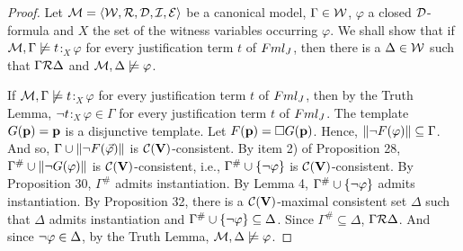 \begin{proof}
	Let $\mathcal{M} = \langle\mathcal{W},\mathcal{R},\mathcal{D},\mathcal{I},\mathcal{E} \rangle$ be a canonical model, $\Gamma \in \mathcal{W}$, $\varphi$ a closed $\mathcal{D}$-formula and $X$ the set of the witness variables occurring $\varphi$. We shall show that if $\mathcal{M}, \Gamma \not\models t$$:_{X}$$\varphi$ for every justification term $t$ of $Fml_{J}$, then there is a $\Delta \in \mathcal{W}$ such that $\Gamma \mathcal{R}\Delta$ and $\mathcal{M}, \Delta \not\models \varphi$.
	
	\qquad If $\mathcal{M}, \Gamma \not\models t$$:_{X}$$\varphi$ for every justification term $t$ of $Fml_{J}$, then by the Truth Lemma, $\neg t$$:_{X}$$\varphi \in \Gamma$ for every justification term $t$ of $Fml_{J}$. The template $G(\textbf{p}) =\textbf{p}$ is a disjunctive template. Let $F(\textbf{p}) = \Box G(\textbf{p})$. Hence, $\Arrowvert \neg F(\varphi)\Arrowvert \subseteq \Gamma$. And so, $\Gamma \cup \Arrowvert \neg F(\vec{\varphi})\Arrowvert$ is $\mathcal{C}(\textbf{V})$-consistent. By item 2) of Proposition 28, $\Gamma^{\#} \cup \Arrowvert \neg G(\varphi)\Arrowvert$ is $\mathcal{C}(\textbf{V})$-consistent, i.e.,  $\Gamma^{\#} \cup \{  \neg \varphi \} $ is $\mathcal{C}(\textbf{V})$-consistent. By Proposition 30, $\Gamma^{\#}$ admits instantiation. By Lemma 4,  $\Gamma^{\#} \cup \{  \neg \varphi \} $ admits instantiation. By Proposition 32, there is a $\mathcal{C}(\textbf{V})$-maximal consistent set $\Delta$ such that $\Delta$ admits instantiation and $\Gamma^{\#} \cup \{  \neg \varphi \}\subseteq\Delta$. Since $\Gamma^{\#} \subseteq \Delta$, $\Gamma \mathcal{R} \Delta$. And since $\neg \varphi \in \Delta$, by the Truth Lemma,  $\mathcal{M}, \Delta \not\models \varphi$.
	
\end{proof}